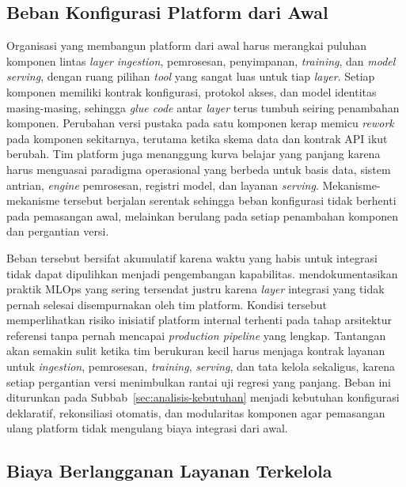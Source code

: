 \subsection{Beban Konfigurasi Platform dari Awal}
\label{subsec:beban-konfigurasi}

Organisasi yang membangun platform dari awal harus merangkai puluhan komponen lintas \textit{layer} \textit{ingestion}, pemrosesan, penyimpanan, \textit{training}, dan \textit{model serving}, dengan ruang pilihan \textit{tool} yang sangat luas untuk tiap \textit{layer}. Setiap komponen memiliki kontrak konfigurasi, protokol akses, dan model identitas masing-masing, sehingga \textit{glue code} antar \textit{layer} terus tumbuh seiring penambahan komponen. Perubahan versi pustaka pada satu komponen kerap memicu \textit{rework} pada komponen sekitarnya, terutama ketika skema data dan kontrak API ikut berubah. Tim platform juga menanggung kurva belajar yang panjang karena harus menguasai paradigma operasional yang berbeda untuk basis data, sistem antrian, \textit{engine} pemrosesan, registri model, dan layanan \textit{serving}. Mekanisme-mekanisme tersebut berjalan serentak sehingga beban konfigurasi tidak berhenti pada pemasangan awal, melainkan berulang pada setiap penambahan komponen dan pergantian versi.

Beban tersebut bersifat akumulatif karena waktu yang habis untuk integrasi tidak dapat dipulihkan menjadi pengembangan kapabilitas. \textcite{shankar2022operationalizing} mendokumentasikan praktik MLOps yang sering tersendat justru karena \textit{layer} integrasi yang tidak pernah selesai disempurnakan oleh tim platform. Kondisi tersebut memperlihatkan risiko inisiatif platform internal terhenti pada tahap arsitektur referensi tanpa pernah mencapai \textit{production pipeline} yang lengkap. Tantangan akan semakin sulit ketika tim berukuran kecil harus menjaga kontrak layanan untuk \textit{ingestion}, pemrosesan, \textit{training}, \textit{serving}, dan tata kelola sekaligus, karena setiap pergantian versi menimbulkan rantai uji regresi yang panjang. Beban ini diturunkan pada Subbab~\ref{sec:analisis-kebutuhan} menjadi kebutuhan konfigurasi deklaratif, rekonsiliasi otomatis, dan modularitas komponen agar pemasangan ulang platform tidak mengulang biaya integrasi dari awal.

\subsection{Biaya Berlangganan Layanan Terkelola}
\label{subsec:biaya-berlangganan}

